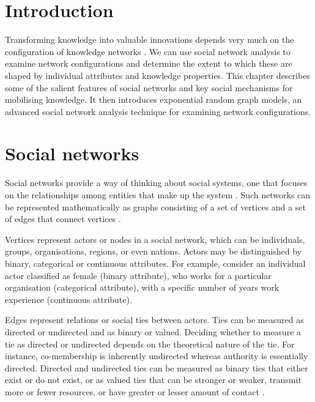 \section{Introduction}

Transforming knowledge into valuable innovations depends very much on the configuration of knowledge networks \citep{tortoriello2010activating}. We can use social network analysis to examine network configurations and determine the extent to which these are shaped by individual attributes and knowledge properties. This chapter describes some of the salient features of social networks and key social mechanisms for mobilising knowledge. It then introduces exponential random graph models, an advanced social network analysis technique for examining network configurations. \medskip  

\section{Social networks}

Social networks provide a way of thinking about social systems, one that focuses on the relationships among entities that make up the system \citep{borgatti2013analyzing,robins2015doing}. Such networks can be represented mathematically as graphs consisting of a set of vertices and a set of edges that connect vertices \citep{newman2010networks}. \medskip

Vertices represent actors or nodes in a social network, which can be individuals, groups, organisations, regions, or even nations. Actors may be distinguished by binary, categorical or continuous attributes. For example, consider an individual actor classified as female (binary attribute), who works for a particular organisation (categorical attribute), with a specific number of years work experience (continuous attribute). \medskip

Edges represent relations or social ties between actors. Ties can be measured as directed or undirected and as binary or valued. Deciding whether to measure a tie as directed or undirected depends on the theoretical nature of the tie. For instance, co-membership is inherently undirected whereas authority is essentially directed. Directed and undirected ties can be measured as binary ties that either exist or do not exist, or as valued ties that can be stronger or weaker, transmit more or fewer resources, or have greater or lesser amount of contact \citep{scott2011sage}.\medskip

